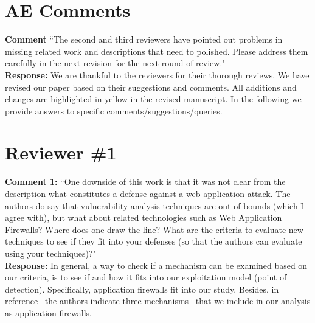 \documentclass[10pt,journal,compsoc]{IEEEtran}
\begin{document}
\maketitle

\IEEEdisplaynontitleabstractindextext

\IEEEpeerreviewmaketitle

\section{AE Comments}
\label{sec:ae}

{\bf Comment} ``The second and third reviewers
have pointed out problems in missing related work and
descriptions that need to polished.
Please address them carefully in the next revision
for the next round of review."\\

\noindent
{\bf Response:}
We are thankful to the reviewers for their thorough reviews.
We have revised our paper based on their suggestions and comments.
All additions and changes are highlighted in yellow
in the revised manuscript.
In the following we provide answers to specific
comments/suggestions/queries.\\

\section{Reviewer \#1}
\label{sec:r1}

{\bf Comment 1:} ``One downside of this work is that it was not clear from the
description what constitutes a defense against a web application
attack. The authors do say that vulnerability analysis techniques are
out-of-bounds (which I agree with), but what about related
technologies such as Web Application Firewalls? Where does one draw
the line? What are the criteria to evaluate new techniques to see if
they fit into your defenses (so that the authors can evaluate using
your techniques)?"\\

\noindent
{\bf Response:}
In general,
a way to check if a mechanism can be examined
based on our criteria,
is to see if and how it fits into our
exploitation model (point of detection).
Specifically,
application firewalls
fit into our study.
Besides,
in reference~\cite{DPJV06}
the authors indicate three mechanisms~\cite{BK04,PB05,HO05b}
that we include in our analysis as
application firewalls.\\

\end{document}
